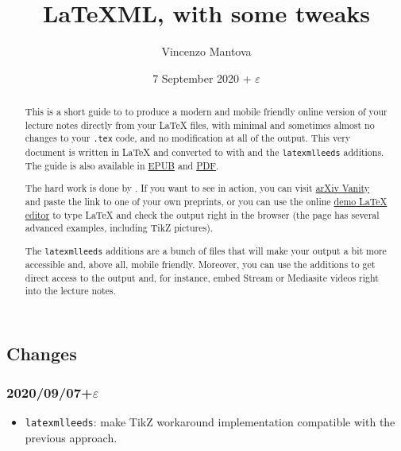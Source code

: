 \documentclass[a4paper]{article}
\title{LaTeXML, with some tweaks}
\author{Vincenzo Mantova}
\date{7 September 2020 + \texorpdfstring{$\varepsilon$}{ɛ}}
\theoremstyle{definition}
\begin{document}
\maketitle

\begin{abstract}
  This is a short guide to \LaTeXML{} to produce a modern and mobile friendly online version of your lecture notes directly from your \LaTeX{} files, with minimal and sometimes almost no changes to your \verb|.tex| code, and no modification at all of the \HTML{} output. This very document is written in \LaTeX{} and converted to \HTML{} with \LaTeXML{} and the \verb|latexmlleeds| additions. The guide is also available in \href{LaTeXML-Leeds.epub}{EPUB} and \href{LaTeXML-Leeds.pdf}{PDF}.

  The hard work is done by \LaTeXML{}. If you want to see \LaTeXML{} in action, you can visit \href{https://www.arxiv-vanity.com/}{arXiv Vanity} and paste the link to one of your own preprints, or you can use the online \href{https://latexml.mathweb.org/editor}{demo \LaTeX{} editor} to type \LaTeX{} and check the \HTML{} output right in the browser (the page has several advanced examples, including TikZ pictures).

  The \verb|latexmlleeds| additions are a bunch of files that will make your output a bit more accessible and, above all, mobile friendly. Moreover, you can use the additions to get direct access to the \HTML{} output and, for instance, embed Stream or Mediasite videos right into the lecture notes.
\end{abstract}

\subsection*{Changes}
\subsubsection*{2020/09/07+\texorpdfstring{$\varepsilon$}{ɛ}}
\begin{itemize}
  \item \verb|latexmlleeds|: make TikZ workaround implementation compatible with the previous approach.
\end{itemize}
\end{document}
